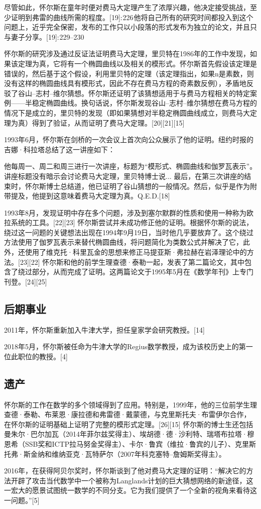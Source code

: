 尽管如此，怀尔斯在童年时便对费马大定理产生了浓厚兴趣，他决定接受挑战，至少证明到弗雷的曲线所需的程度。[19]: 226 他将自己所有的研究时间都投入到这个问题上，近乎完全保密，发布的工作只以小段落的形式发布为独立的论文，并且只与妻子分享。[19]: 229–230 

怀尔斯的研究涉及通过反证法证明费马大定理，里贝特在1986年的工作中发现，如果该定理为真，它将有一个椭圆曲线以及相关的模形式。怀尔斯首先假设该定理是错误的，然后基于这个假设，利用里贝特的定理（该定理指出，如果n是素数，则没有这样的椭圆曲线具有模形式，因此不存在费马方程的奇素数反例），矛盾地反驳了谷山–志村–维尔猜想。怀尔斯还证明了该猜想适用于与费马方程相关的特定案例——半稳定椭圆曲线。换句话说，怀尔斯发现谷山–志村–维尔猜想在费马方程的情况下是成立的，里贝特的发现（即如果猜想对半稳定椭圆曲线成立，则费马大定理为真）得到了验证，从而证明了费马大定理。[20][21][15]

1993年6月，怀尔斯在剑桥的一次会议上首次向公众展示了他的证明。纽约时报的吉娜·科拉塔总结了这一讲座如下：

他每周一、周二和周三进行一次讲座，标题为“模形式、椭圆曲线和伽罗瓦表示”。讲座标题没有暗示会讨论费马大定理，里贝特博士说... 最后，在第三次讲座的结束时，怀尔斯博士总结道，他已证明了谷山猜想的一般情况。然后，似乎是作为附带提及，他提到这意味着费马大定理为真。Q.E.D.[18]

1993年8月，发现证明中存在多个问题，涉及到塞尔默群的性质和使用一种称为欧拉系统的工具。[22][23] 怀尔斯尝试并未成功修正他的证明。根据怀尔斯的说法，绕过这一问题的关键想法出现在1994年9月19日，当时他几乎要放弃了。这个绕过方法使用了伽罗瓦表示来替代椭圆曲线，将问题简化为类数公式并解决了它，此外，还使用了维克托·科里瓦金的思想来修正马提亚斯·弗拉赫在岩泽理论中的方法。[23][22] 怀尔斯和他的前学生理查德·泰勒一起，发表了第二篇论文，其中包含了绕过部分，从而完成了证明。这两篇论文于1995年5月在《数学年刊》上专门刊登。[24][25]
\subsection{后期事业}
2011年，怀尔斯重新加入牛津大学，担任皇家学会研究教授。[14]

2018年5月，怀尔斯被任命为牛津大学的Regius数学教授，成为该校历史上的第一位此职位的教授。[4]
\subsection{遗产}  
怀尔斯的工作在数学的多个领域得到了应用。特别是，1999年，他的三位前学生理查德·泰勒、布莱恩·康拉德和弗雷德·戴蒙德，与克里斯托夫·布雷伊尔合作，在怀尔斯的证明基础上证明了完整的模形式定理。[26][15] 怀尔斯的博士生还包括曼朱尔·巴尔加瓦（2014年菲尔兹奖得主）、埃胡德·德·沙利特、瑞塔布拉塔·穆恩希（SSB奖和ICTP拉马努金奖得主）、卡尔·鲁宾（维拉·鲁宾的儿子）、克里斯托弗·斯金纳和维纳亚克·瓦特萨尔（2007年科克塞特–詹姆斯奖得主）。

2016年，在获得阿贝尔奖时，怀尔斯谈到了他对费马大定理的证明：“解决它的方法开辟了攻击当代数学中一个被称为Langlands计划的巨大猜想网络的新途径，这一宏大的愿景试图统一数学的不同分支。它为我们提供了一个全新的视角来看待这一问题。”[5]